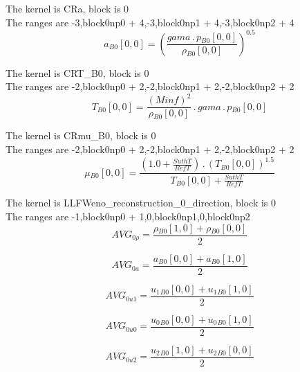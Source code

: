 \documentclass{article}
\begin{document}
\noindent The kernel is CRa, block is 0\\\noindent The ranges are -3,block0np0 + 4,-3,block0np1 + 4,-3,block0np2 + 4\\\begin{dmath}{a{_{B0}}}[{0,0}] = \left(\frac{gama \,.\, {p{_{B0}}}[{0,0}]}{{\rho{_{B0}}}[{0,0}]} \right)^{0.5}\end{dmath}

\noindent The kernel is CRT_B0, block is 0\\\noindent The ranges are -2,block0np0 + 2,-2,block0np1 + 2,-2,block0np2 + 2\\\begin{dmath}{T{_{B0}}}[{0,0}] = \frac{\left(Minf \right)^{2}}{{\rho{_{B0}}}[{0,0}]} \,.\, gama \,.\, {p{_{B0}}}[{0,0}]\end{dmath}

\noindent The kernel is CRmu_B0, block is 0\\\noindent The ranges are -2,block0np0 + 2,-2,block0np1 + 2,-2,block0np2 + 2\\\begin{dmath}{\mu{_{B0}}}[{0,0}] = \frac{\left(1.0 + \frac{SuthT}{RefT}\right) \,.\, \left({T{_{B0}}}[{0,0}] \right)^{1.5}}{{T{_{B0}}}[{0,0}] + \frac{SuthT}{RefT}}\end{dmath}

\noindent The kernel is LLFWeno_reconstruction_0_direction, block is 0\\\noindent The ranges are -1,block0np0 + 1,0,block0np1,0,block0np2\\\begin{dmath}AVG_{0 \rho} = \frac{{\rho{_{B0}}}[{1,0}] + {\rho{_{B0}}}[{0,0}]}{2}\end{dmath}

\begin{dmath}AVG_{0 a} = \frac{{a{_{B0}}}[{0,0}] + {a{_{B0}}}[{1,0}]}{2}\end{dmath}

\begin{dmath}AVG_{0 u1} = \frac{{u_{1}{_{B0}}}[{0,0}] + {u_{1}{_{B0}}}[{1,0}]}{2}\end{dmath}

\begin{dmath}AVG_{0 u0} = \frac{{u_{0}{_{B0}}}[{0,0}] + {u_{0}{_{B0}}}[{1,0}]}{2}\end{dmath}

\begin{dmath}AVG_{0 u2} = \frac{{u_{2}{_{B0}}}[{1,0}] + {u_{2}{_{B0}}}[{0,0}]}{2}\end{dmath}
\end{document}
